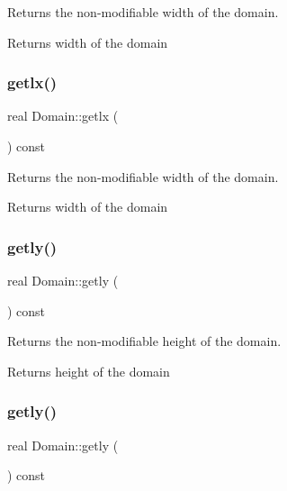 Returns the non-\/modifiable width of the domain. 

\begin{DoxyReturn}{Returns}
width of the domain 
\end{DoxyReturn}
\mbox{\label{classDomain_a510afad91fe81eb2ccef203a980f4223}} 
\subsubsection{\texorpdfstring{getlx()}{getlx()}\hspace{0.1cm}{\footnotesize\ttfamily [2/2]}}
{\footnotesize\ttfamily real Domain\+::getlx (\begin{DoxyParamCaption}{ }\end{DoxyParamCaption}) const}



Returns the non-\/modifiable width of the domain. 

\begin{DoxyReturn}{Returns}
width of the domain 
\end{DoxyReturn}
\mbox{\label{classDomain_ac9cedab179bb0611fc0e9fcfbcedb835}} 
\subsubsection{\texorpdfstring{getly()}{getly()}\hspace{0.1cm}{\footnotesize\ttfamily [1/2]}}
{\footnotesize\ttfamily real Domain\+::getly (\begin{DoxyParamCaption}{ }\end{DoxyParamCaption}) const}



Returns the non-\/modifiable height of the domain. 

\begin{DoxyReturn}{Returns}
height of the domain 
\end{DoxyReturn}
\mbox{\label{classDomain_ac9cedab179bb0611fc0e9fcfbcedb835}} 
\subsubsection{\texorpdfstring{getly()}{getly()}\hspace{0.1cm}{\footnotesize\ttfamily [2/2]}}
{\footnotesize\ttfamily real Domain\+::getly (\begin{DoxyParamCaption}{ }\end{DoxyParamCaption}) const}



